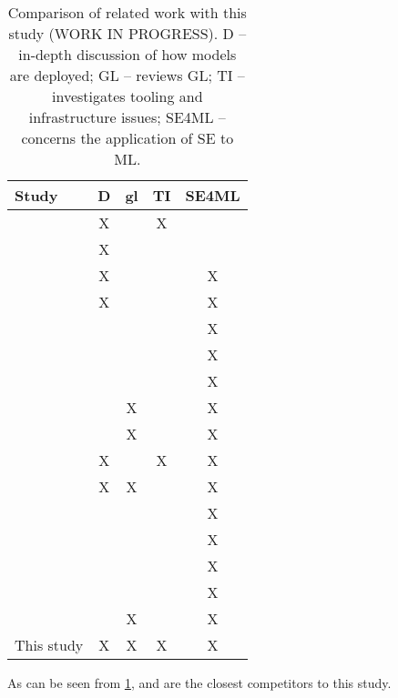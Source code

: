 \begin{table}[h]
    \centering
    \begin{tabular}{l c c c c}
        Study & D & \acrshort{gl} & TI & SE4ML \\
        \hline
        \cite{Shahin2017} & X & & X & \\
        \cite{Rodriguez2017} & X & & & \\
        \cite{Baier2019} & X & & & X \\
        \cite{Paleyes2020} & X & & & X \\
        \cite{Kumeno2020} & & & & X \\
        \cite{Nascimento2020} & & & & X \\
        \cite{Lwakatare2020} & & & & X \\
        \cite{Lwakatare2020a} & & X & & X \\
        \cite{Serban2020} & & X & & X \\
        \cite{Karamitsos2020} & X & & X & X \\
        \cite{John2021} & X & X & & X \\
        \cite{Giray2021} & & & & X \\
        \cite{Lorenzoni2021} & & & & X \\
        \cite{MartinezFernandez2021} & & & & X \\
        \cite{Serban2021} & & & & X \\
        \cite{John2021a} & & X & & X \\
        This study & X & X & X & X \\
    \end{tabular}
    \caption{Comparison of related work with this study (WORK IN PROGRESS). D -- in-depth discussion of how models are deployed; GL -- reviews GL; TI -- investigates tooling and infrastructure issues; SE4ML -- concerns the application of SE to ML.}
    \label{tab:related_work_comparison}
\end{table}

As can be seen from \cref{tab:related_work_comparison}, \cite{Karamitsos2020} and \cite{John2021} are the closest competitors to this study.

